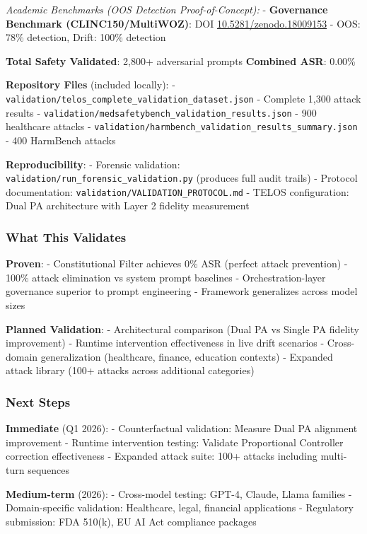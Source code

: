 \emph{Academic Benchmarks (OOS Detection Proof-of-Concept):} -
\textbf{Governance Benchmark (CLINC150/MultiWOZ)}: DOI
\href{https://doi.org/10.5281/zenodo.18009153}{10.5281/zenodo.18009153}
- OOS: 78\% detection, Drift: 100\% detection

\textbf{Total Safety Validated}: 2,800+ adversarial prompts \textbar{}
\textbf{Combined ASR}: 0.00\%

\textbf{Repository Files} (included locally): -
\texttt{validation/telos\_complete\_validation\_dataset.json} - Complete
1,300 attack results -
\texttt{validation/medsafetybench\_validation\_results.json} - 900
healthcare attacks -
\texttt{validation/harmbench\_validation\_results\_summary.json} - 400
HarmBench attacks

\textbf{Reproducibility}: - Forensic validation:
\texttt{validation/run\_forensic\_validation.py} (produces full audit
trails) - Protocol documentation:
\texttt{validation/VALIDATION\_PROTOCOL.md} - TELOS configuration: Dual
PA architecture with Layer 2 fidelity measurement

\subsubsection{What This Validates}\label{what-this-validates}

\textbf{Proven}: - Constitutional Filter achieves 0\% ASR (perfect
attack prevention) - 100\% attack elimination vs system prompt baselines
- Orchestration-layer governance superior to prompt engineering -
Framework generalizes across model sizes

\textbf{Planned Validation}: - Architectural comparison (Dual PA vs
Single PA fidelity improvement) - Runtime intervention effectiveness in
live drift scenarios - Cross-domain generalization (healthcare, finance,
education contexts) - Expanded attack library (100+ attacks across
additional categories)

\subsubsection{Next Steps}\label{next-steps}

\textbf{Immediate} (Q1 2026): - Counterfactual validation: Measure Dual
PA alignment improvement - Runtime intervention testing: Validate
Proportional Controller correction effectiveness - Expanded attack
suite: 100+ attacks including multi-turn sequences

\textbf{Medium-term} (2026): - Cross-model testing: GPT-4, Claude, Llama
families - Domain-specific validation: Healthcare, legal, financial
applications - Regulatory submission: FDA 510(k), EU AI Act compliance
packages

